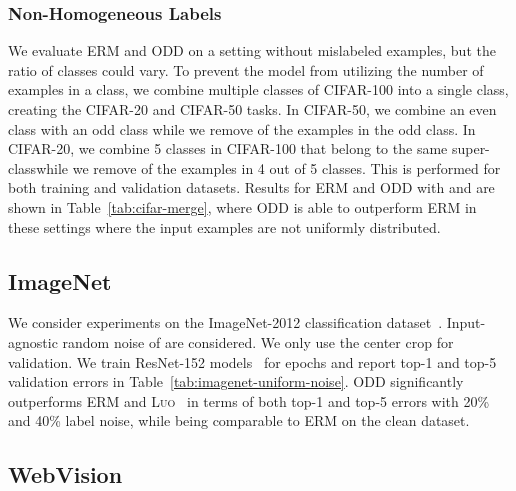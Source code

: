 \documentclass[a4paper,11pt]{article}
\begin{document}
\subsubsection{Non-Homogeneous Labels}
We evaluate \textsc{ERM} and \textsc{ODD} on a setting without mislabeled examples, but the ratio of classes could vary. To prevent the model from utilizing the number of examples in a class, we combine multiple classes of CIFAR-100 into a single class, creating the CIFAR-20 and CIFAR-50 tasks. In CIFAR-50, we combine an even class with an odd class while we remove  of the examples in the odd class. In CIFAR-20, we combine 5 classes in CIFAR-100 that belong to the same super-classwhile we remove  of the examples in 4 out of 5 classes. This is performed for both training and validation datasets. Results for \textsc{ERM} and \textsc{ODD} with  and  are shown in Table~\ref{tab:cifar-merge}, where \textsc{ODD} is able to outperform \textsc{ERM} in these settings where the input examples are not uniformly distributed.





\subsection{ImageNet}
\label{sec:exp-imagenet}
We consider experiments on the ImageNet-2012 classification dataset~\cite{russakovsky2015imagenet}.  Input-agnostic random noise of  are considered. We only use the center  crop for validation. 
We train ResNet-152 models~\cite{he2015deep} for  epochs and report top-1 and top-5 validation errors in Table~\ref{tab:imagenet-uniform-noise}. \textsc{ODD} significantly outperforms \textsc{ERM} and \textsc{Luo}~\cite{luo2019simple} in terms of both top-1 and top-5 errors with 20\% and 40\% label noise, while being comparable to \textsc{ERM} on the clean dataset.







\subsection{WebVision}
\label{sec:exp-webvision}
\end{document}
